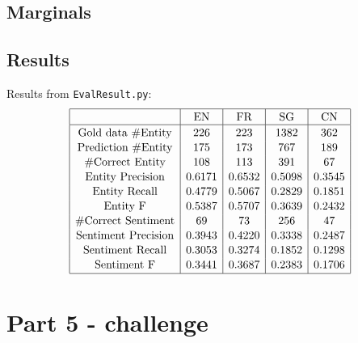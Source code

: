 \documentclass[12pt]{article}
\begin{document}
\subsection{Marginals}

\subsection{Results}
Results from \verb|EvalResult.py|:
\[
\begin{array}{|c|c|c|c|c|}
\hline \rule{0pt}{1em}
& \mbox{EN} & \mbox{FR} & \mbox{SG} & \mbox{CN} \\
\hline \rule{0pt}{1em}
\mbox{Gold data \#Entity} & 226    & 223    & 1382   & 362    \\[0.1em]
\mbox{Prediction \#Entity}& 175    & 173    & 767    & 189    \\[0.1em]
\mbox{\#Correct Entity}   & 108    & 113    & 391    & 67     \\[0.1em]
\mbox{Entity Precision}   & 0.6171 & 0.6532 & 0.5098 & 0.3545 \\[0.1em]
\mbox{Entity Recall}      & 0.4779 & 0.5067 & 0.2829 & 0.1851 \\[0.1em]
\mbox{Entity F}           & 0.5387 & 0.5707 & 0.3639 & 0.2432 \\[0.1em]
\mbox{\#Correct Sentiment}& 69     & 73     & 256    & 47     \\[0.1em]
\mbox{Sentiment Precision}& 0.3943 & 0.4220 & 0.3338 & 0.2487 \\[0.1em]
\mbox{Sentiment Recall}   & 0.3053 & 0.3274 & 0.1852 & 0.1298 \\[0.1em]
\mbox{Sentiment F}        & 0.3441 & 0.3687 & 0.2383 & 0.1706 \\[0.1em] 
\hline
\end{array}
\]



\pagebreak

\section{Part 5 - challenge}
\end{document}
